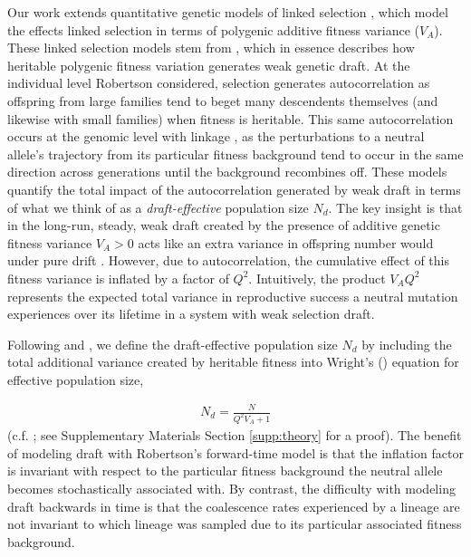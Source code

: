 \documentclass[11pt]{article}
\begin{document}
Our work extends quantitative genetic models of linked selection
\parencite{Robertson1961-ho,Santiago1995-hx,Santiago1998-bs,Santiago2016-mu},
which model the effects linked selection in terms of polygenic additive fitness
variance ($V_A$). These linked selection models stem from
\textcite{Robertson1961-ho}, which in essence describes how heritable polygenic
fitness variation generates weak genetic draft. At the individual level
Robertson considered, selection generates autocorrelation as offspring from
large families tend to beget many descendents themselves (and likewise with
small families) when fitness is heritable. This same autocorrelation occurs at
the genomic level with linkage \parencite{Santiago1998-bs,Barton2000-zg}, as
the perturbations to a neutral allele's trajectory from its particular fitness
background tend to occur in the same direction across generations until the
background recombines off. These models quantify the total impact of the
autocorrelation generated by weak draft in terms of what we think of as a
\emph{draft-effective} population size $N_d$. The key insight is that in the
long-run, steady, weak draft created by the presence of additive genetic
fitness variance $V_A > 0$ acts like an extra variance in offspring number
would under pure drift \parencite{Wright1938-tv}. However, due to
autocorrelation, the cumulative effect of this fitness variance is inflated by
a factor of $Q^2$. Intuitively, the product $V_A Q^2$ represents the expected
total variance in reproductive success a neutral mutation experiences over its
lifetime in a system with weak selection draft. 

Following \textcite{Robertson1961-ho} and \textcite{Santiago1995-hx}, we define
the draft-effective population size $N_d$ by including the total additional
variance created by heritable fitness into Wright's (\citeyear{Wright1938-tv})
equation for effective population size,

\begin{align}
    \label{eq:main_Ne}
    N_d = \frac{N}{Q^2 V_A + 1}
\end{align}
%
(c.f. \cite{Robertson1961-ho,Santiago1995-hx}; see Supplementary Materials Section
\ref{supp:theory} for a proof). The benefit of modeling draft with Robertson's
forward-time model is that the inflation factor is invariant with respect to
the particular fitness background the neutral allele becomes stochastically
associated with. By contrast, the difficulty with modeling draft backwards in
time is that the coalescence rates experienced by a lineage are not invariant
to which lineage was sampled due to its particular associated fitness
background.
\end{document}
